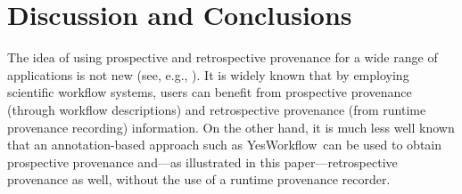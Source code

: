 \documentclass[letterpaper,twocolumn,10pt]{article}
\newcommand{\figref}[1]{Fig.\,\ref{#1}}
\newcommand{\code}[1]{\ensuremath{\mathtt{#1}}}
\newcommand{\YW}{\textsf{YesWorkflow}}
\newcommand{\yw}{\textsf{YW}}
\begin{document}





\section{Discussion and Conclusions} 
\label{sec:discussion}

The idea of using prospective and retrospective provenance for a wide
range of applications is not new (see, e.g.,
\cite{zhao2006applying,missier2008data,frew2008automatic}).  It is
widely known that by employing scientific workflow systems, users can
benefit from prospective provenance (through workflow descriptions)
and retrospective provenance (from runtime provenance recording)
information. On the other hand, it is much less well known that an
annotation-based approach such as \YW\ can be used to obtain
prospective provenance and---as illustrated in this
paper---retrospective provenance as well, without the use of a runtime
provenance recorder.  
\end{document}
